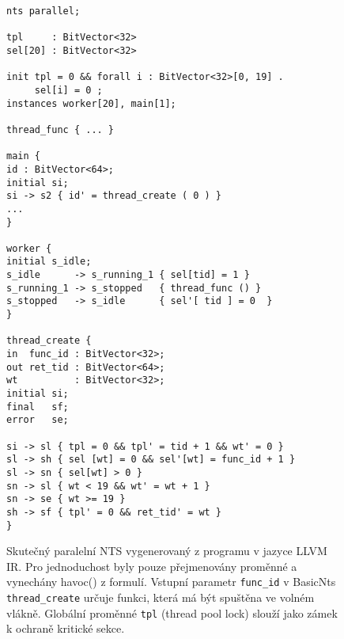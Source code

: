 \documentclass[12pt]{fithesis2}
\begin{document}
\begin{figure}[h!]
\begin{lstlisting}[breaklines=true]
nts parallel;

tpl     : BitVector<32>
sel[20] : BitVector<32>

init tpl = 0 && forall i : BitVector<32>[0, 19] .
     sel[i] = 0 ;
instances worker[20], main[1];

thread_func { ... }

main {
id : BitVector<64>;
initial	si;
si -> s2 { id' = thread_create ( 0 ) }
...
}

worker {
initial	s_idle;
s_idle      -> s_running_1 { sel[tid] = 1 }
s_running_1 -> s_stopped   { thread_func () }
s_stopped   -> s_idle      { sel'[ tid ] = 0  }
}

thread_create {
in  func_id : BitVector<32>;
out ret_tid : BitVector<64>;
wt          : BitVector<32>;
initial	si;
final	sf;
error	se;

si -> sl { tpl = 0 && tpl' = tid + 1 && wt' = 0 }
sl -> sh { sel [wt] = 0 && sel'[wt] = func_id + 1 }
sl -> sn { sel[wt] > 0 }
sn -> sl { wt < 19 && wt' = wt + 1 }
sn -> se { wt >= 19 }
sh -> sf { tpl' = 0 && ret_tid' = wt }
}
\end{lstlisting}
\caption{Skutečný paralelní NTS vygenerovaný z programu v jazyce LLVM IR. Pro jednoduchost byly pouze přejmenovány proměnné a vynechány havoc() z formulí. Vstupní parametr \texttt{func\_id} v BasicNts \texttt{thread\_create} určuje funkci, která má být spuštěna ve volném vlákně. Globální proměnné \texttt{tpl} (thread pool lock) slouží jako zámek k ochraně kritické sekce.}
\label{fig:appendix:real-parallel-nts}
\end{figure}

\printbibliography
\end{document}
